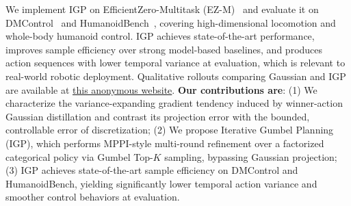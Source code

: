 We implement IGP on EfficientZero-Multitask (EZ-M)~\citep{liu2026scaling} and evaluate it on DMControl~\citep{tassa2018deepmind} and HumanoidBench~\citep{sferrazza2024humanoidbench}, covering high-dimensional locomotion and whole-body humanoid control. IGP achieves state-of-the-art performance, improves sample efficiency over strong model-based baselines, and produces action sequences with lower temporal variance at evaluation, which is relevant to real-world robotic deployment. Qualitative rollouts comparing Gaussian and IGP are available at \href{https://mellifluous-marzipan-a1cb45.netlify.app/}{this anonymous website}. \textbf{Our contributions are}: (1) We characterize the variance-expanding gradient tendency induced by winner-action Gaussian distillation and contrast its projection error with the bounded, controllable error of discretization; (2) We propose Iterative Gumbel Planning (IGP), which performs MPPI-style multi-round refinement over a factorized categorical policy via Gumbel Top-$K$ sampling, bypassing Gaussian projection; (3) IGP achieves state-of-the-art sample efficiency on DMControl and HumanoidBench, yielding significantly lower temporal action variance and smoother control behaviors at evaluation.
